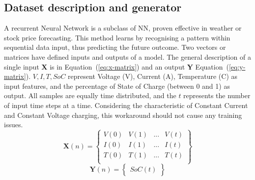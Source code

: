 \subsection{Dataset description and generator} \label{subsec:dataset}
%
A recurrent Neural Network is a subclass of NN, proven effective in weather or stock price forecasting.
This method learns by recognising a pattern within sequential data input, thus predicting the future outcome.
Two vectors or matrices have defined inputs and outputs of a model.
The general description of a single input \textbf{X} is in \mbox{Equation~(\ref{eq:x-matrix})} and an output \textbf{Y} \mbox{Equation~(\ref{eq:y-matrix})}.
$V, I, T, SoC$ represent Voltage (V), Current (A), Temperature (\textdegree{}C) as input features, and the percentage of State of Charge (between 0 and 1) as output.
All samples are equally time distributed, and the $t$ represents the number of input time steps at a time.
Considering the characteristic of Constant Current and Constant Voltage charging, this workaround should not cause any training issues.
\begin{equation}
    \textbf{X} \left (n  \right ) =
    \begin{Bmatrix}
        V \left (0  \right ) & V \left (1  \right ) & ... & V \left (t  \right )\\ 
        I \left (0  \right ) & I \left (1  \right ) & ... & I \left (t  \right )\\ 
        T \left (0  \right ) & T \left (1  \right ) & ... & T \left (t  \right )\\
    \end{Bmatrix}
    \label{eq:x-matrix}
\end{equation}
\begin{equation}
    \textbf{Y} \left (n  \right ) =
    \begin{Bmatrix}
        SoC \left (t  \right ) 
    \end{Bmatrix}
    \label{eq:y-matrix}
\end{equation}

